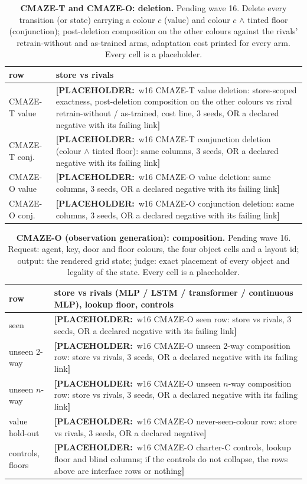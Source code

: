 \documentclass{article} %
\newcommand{\PLACEHOLDER}[1]{{\color{red}\textbf{[PLACEHOLDER:}~#1\textbf{]}}}
\begin{document}
\begin{table}[t]
\centering\small
\caption{\textbf{CMAZE-T and CMAZE-O: deletion.} Pending wave 16. Delete every transition (or
state) carrying a colour $c$ (value) and colour $c$ $\wedge$ tinted floor (conjunction);
post-deletion composition on the other colours against the rivals' retrain-without and
as-trained arms, adaptation cost printed for every arm. Every cell is a placeholder.}
\label{tab:cmaze-del}
\setlength{\tabcolsep}{2.5pt}
\begin{tabular}{p{2.6cm}p{10.6cm}}
\toprule
row & store vs rivals \\
\midrule
CMAZE-T value & \PLACEHOLDER{w16 CMAZE-T value deletion: store-scoped exactness, post-deletion composition on the other colours vs rival retrain-without / as-trained, cost line, 3 seeds, OR a declared negative with its failing link} \\
CMAZE-T conj. & \PLACEHOLDER{w16 CMAZE-T conjunction deletion (colour $\wedge$ tinted floor): same columns, 3 seeds, OR a declared negative with its failing link} \\
CMAZE-O value & \PLACEHOLDER{w16 CMAZE-O value deletion: same columns, 3 seeds, OR a declared negative with its failing link} \\
CMAZE-O conj. & \PLACEHOLDER{w16 CMAZE-O conjunction deletion: same columns, 3 seeds, OR a declared negative with its failing link} \\
\bottomrule
\end{tabular}
\end{table}

\begin{table}[t]
\centering\small
\caption{\textbf{CMAZE-O (observation generation): composition.} Pending wave 16. Request:
agent, key, door and floor colours, the four object cells and a layout id; output: the rendered
grid state; judge: exact placement of every object and legality of the state. Every cell is a
placeholder.}
\label{tab:cmazeo}
\setlength{\tabcolsep}{2.5pt}
\begin{tabular}{p{2.6cm}p{10.6cm}}
\toprule
row & store vs rivals (MLP / LSTM / transformer / continuous MLP), lookup floor, controls \\
\midrule
seen & \PLACEHOLDER{w16 CMAZE-O seen row: store vs rivals, 3 seeds, OR a declared negative with its failing link} \\
unseen 2-way & \PLACEHOLDER{w16 CMAZE-O unseen 2-way composition row: store vs rivals, 3 seeds, OR a declared negative with its failing link} \\
unseen $n$-way & \PLACEHOLDER{w16 CMAZE-O unseen $n$-way composition row: store vs rivals, 3 seeds, OR a declared negative with its failing link} \\
value hold-out & \PLACEHOLDER{w16 CMAZE-O never-seen-colour row: store vs rivals, 3 seeds, OR a declared negative} \\
controls, floors & \PLACEHOLDER{w16 CMAZE-O charter-C controls, lookup floor and blind columns; if the controls do not collapse, the rows above are interface rows or nothing} \\
\bottomrule
\end{tabular}
\end{table}
\end{document}
